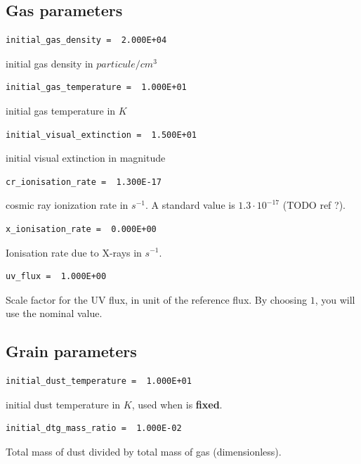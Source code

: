 \documentclass[english,a4paper,twoside]{article}
\begin{document}
\subsection{Gas parameters}


\begin{verbatim}
initial_gas_density =  2.000E+04
\end{verbatim}
initial gas density in $\unit{particule/cm^{3}}$

\begin{verbatim}
initial_gas_temperature =  1.000E+01
\end{verbatim}
initial gas temperature  in $\unit{K}$

\begin{verbatim}
initial_visual_extinction =  1.500E+01
\end{verbatim}
initial visual extinction in magnitude

\begin{verbatim}
cr_ionisation_rate =  1.300E-17
\end{verbatim}
cosmic ray ionization rate in $\unit{s^{-1}}$. A standard value is $1.3\cdot 10^{-17}$ (TODO ref ?).

\begin{verbatim}
x_ionisation_rate =  0.000E+00
\end{verbatim}
Ionisation rate due to X-rays in $\unit{s^{-1}}$.

\begin{verbatim}
uv_flux =  1.000E+00
\end{verbatim}
Scale factor for the UV flux, in unit of the reference flux. By choosing $1$, you will use the nominal value.

\subsection{Grain parameters}
\begin{verbatim}
initial_dust_temperature =  1.000E+01
\end{verbatim}
initial dust temperature in $\unit{K}$, used when  is \textbf{fixed}.

\begin{verbatim}
initial_dtg_mass_ratio =  1.000E-02
\end{verbatim}
Total mass of dust divided by total mass of gas (dimensionless).
\end{document}
